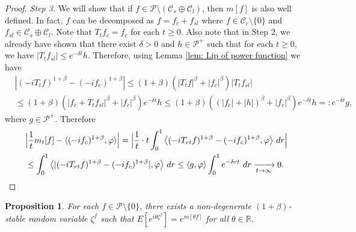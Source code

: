 \documentclass[12pt,a4paper]{amsart}
\theoremstyle{plain}
\newtheorem{prop}[thm]{Proposition}
\theoremstyle{definition}
\numberwithin{equation}{section}
\begin{document}
\begin{proof}
  \emph{Step 3.} We will show that if $f\in \mathcal P \setminus (\mathcal C_s \oplus \mathcal C_l)$, then $m[f]$ is also well defined.
  In fact, $f$ can be decomposed as $f = f_c + f_{sl}$ where $f \in \mathcal C_c\setminus \{0\}$ and $f_{sl}\in \mathcal C_s \oplus \mathcal C_l$.
  Note that $T_t f_c = f_c$ for each $t\geq 0$.
  Also note that in Step 2, we already have shown that there exist $\delta > 0$ and $h \in \mathcal P^+$ such that for each $t\geq 0$, we have $|T_t f_{sl}| \leq e^{- \delta t}h$.
  Therefore, using Lemma \ref{lem: Lip of power function} we have
  \begin{align}
    &|(-iT_t f)^{1+\beta} - (-i f_c)^{1+\beta}|
      \leq (1+\beta) ( |T_tf|^\beta + |f_c|^\beta) |T_tf_{sl}|
    \\&\leq (1+\beta) ( |f_c + T_t f_{sl}|^\beta + |f_c|^\beta) e^{- \delta t} h
    \leq (1+\beta) ( (|f_c| + |h|)^\beta + |f_c|^\beta) e^{- \delta t} h
    =: e^{- \delta t} g,
  \end{align}
  where $g\in \mathcal P^+$.
  Therefore
  \begin{align}
    \label{eq:P:S:1}
    &\Big| \frac{1}{t} m_t[f] - \langle (-if_c)^{1+\beta}, \varphi\rangle\Big|
      = \Big| \frac{1}{t} \cdot t \int_0^1  \big\langle (-iT_{rt}f)^{1+\beta} - (-if_c)^{1+\beta}, \varphi\big \rangle ~dr \Big|\\
    &\leq \int_0^1  \big\langle |(-iT_{rt}f)^{1+\beta} - (-if_c)^{1+\beta}|, \varphi\big \rangle ~dr 
      \leq \langle g,\varphi\rangle\int_0^1 e^{-\delta rt} ~dr
      \xrightarrow[t\to \infty]{} 0.
      \qedhere
  \end{align}
\end{proof}

\begin{prop}
  \label{prop:PL:S}
  For each $f \in \mathcal P\setminus \{0\}$, there exists a non-degenerate $(1+\beta)$-stable random variable $\zeta^f$ such that $ E[e^{i\theta\zeta^f}] = e^{m[\theta f]}$ for all $\theta \in \mathbb R$.
\end{prop}
\end{document}
